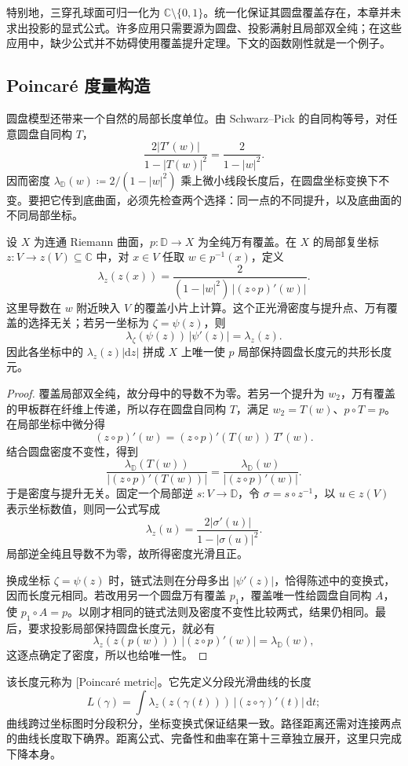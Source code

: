\ProseParagraphBreak
特别地，三穿孔球面可归一化为 \(\mathbb C\setminus\{0,1\}\)。统一化保证其圆盘覆盖存在，本章并未求出投影的显式公式。许多应用只需要源为圆盘、投影满射且局部双全纯；在这些应用中，缺少公式并不妨碍使用覆盖提升定理。下文的函数刚性就是一个例子。

\subsection{Poincaré 度量构造}
\label{b3:subsec:120403}

圆盘模型还带来一个自然的局部长度单位。由 Schwarz--Pick 的自同构等号，对任意圆盘自同构 \(T\)，
\[
 \frac{2|T'(w)|}{1-|T(w)|^2}=\frac2{1-|w|^2}.
\]
因而密度 \(\lambda_{\mathbb D}(w)\coloneqq2/(1-|w|^2)\) 乘上微小线段长度后，在圆盘坐标变换下不变。要把它传到底曲面，必须先检查两个选择：同一点的不同提升，以及底曲面的不同局部坐标。

\begin{proposition}[圆盘长度元的下降]\label{b3:prop:12-poincare-descent}
设 \(X\) 为连通 Riemann 曲面，\(p:\mathbb D\to X\) 为全纯万有覆盖。在 \(X\) 的局部复坐标 \(z:V\to z(V)\subseteq\mathbb C\) 中，对 \(x\in V\) 任取 \(w\in p^{-1}(x)\)，定义
\[
 \lambda_z(z(x))=
 \frac{2}{(1-|w|^2)\,\bigl|(z\circ p)'(w)\bigr|}.
\]
这里导数在 \(w\) 附近映入 \(V\) 的覆盖小片上计算。这个正光滑密度与提升点、万有覆盖的选择无关；若另一坐标为 \(\zeta=\psi(z)\)，则
\[
 \lambda_\zeta(\psi(z))\,|\psi'(z)|=\lambda_z(z).
\]
因此各坐标中的 \(\lambda_z(z)|\mathrm dz|\) 拼成 \(X\) 上唯一使 \(p\) 局部保持圆盘长度元的共形长度元。
\end{proposition}
\begin{proof}
覆盖局部双全纯，故分母中的导数不为零。若另一个提升为 \(w_2\)，万有覆盖的甲板群在纤维上传递，所以存在圆盘自同构 \(T\)，满足 \(w_2=T(w)\)、\(p\circ T=p\)。在局部坐标中微分得
\[
 (z\circ p)'(w)=(z\circ p)'(T(w))\,T'(w).
\]
结合圆盘密度不变性，得到
\[
 \frac{\lambda_{\mathbb D}(T(w))}
      {|(z\circ p)'(T(w))|}
 =\frac{\lambda_{\mathbb D}(w)}
       {|(z\circ p)'(w)|}.
\]
于是密度与提升无关。固定一个局部逆 \(s:V\to\mathbb D\)，令 \(\sigma=s\circ z^{-1}\)，以 \(u\in z(V)\) 表示坐标数值，则同一公式写成
\[
 \lambda_z(u)=\frac{2|\sigma'(u)|}{1-|\sigma(u)|^2}.
\]
局部逆全纯且导数不为零，故所得密度光滑且正。

换成坐标 \(\zeta=\psi(z)\) 时，链式法则在分母多出 \(|\psi'(z)|\)，恰得陈述中的变换式，因而长度元相同。若改用另一个圆盘万有覆盖 \(p_1\)，覆盖唯一性给圆盘自同构 \(A\)，使 \(p_1\circ A=p\)。以刚才相同的链式法则及密度不变性比较两式，结果仍相同。最后，要求投影局部保持圆盘长度元，就必有
\[
 \lambda_z(z(p(w)))\,|(z\circ p)'(w)|=\lambda_{\mathbb D}(w),
\]
这逐点确定了密度，所以也给唯一性。
\end{proof}
该长度元称为 [Poincaré metric]。它先定义分段光滑曲线的长度
\[
 L(\gamma)=\int \lambda_z(z(\gamma(t)))\,
                 |(z\circ\gamma)'(t)|\,\mathrm dt;
\]
曲线跨过坐标图时分段积分，坐标变换式保证结果一致。路径距离还需对连接两点的曲线长度取下确界。距离公式、完备性和曲率在第十三章独立展开，这里只完成下降本身。

